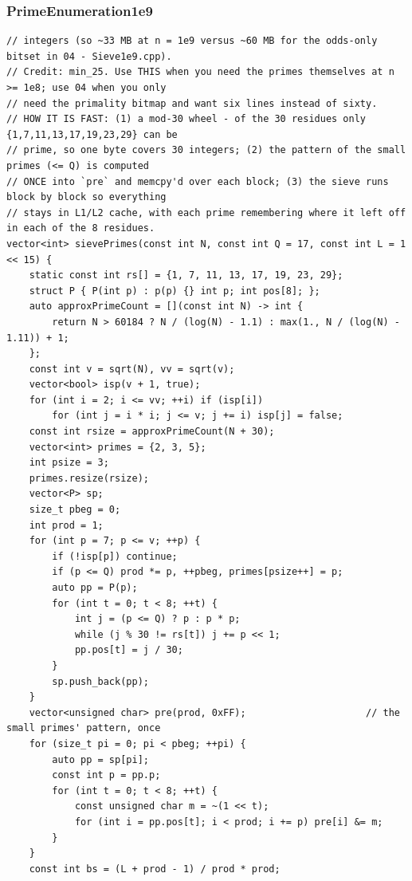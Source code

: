 \documentclass[9pt,a4paper,twocolumn]{extarticle}
\begin{document}
\subsubsection{PrimeEnumeration1e9}
\nopagebreak
\begin{lstlisting}
// integers (so ~33 MB at n = 1e9 versus ~60 MB for the odds-only bitset in 04 - Sieve1e9.cpp).
// Credit: min_25. Use THIS when you need the primes themselves at n >= 1e8; use 04 when you only
// need the primality bitmap and want six lines instead of sixty.
// HOW IT IS FAST: (1) a mod-30 wheel - of the 30 residues only {1,7,11,13,17,19,23,29} can be
// prime, so one byte covers 30 integers; (2) the pattern of the small primes (<= Q) is computed
// ONCE into `pre` and memcpy'd over each block; (3) the sieve runs block by block so everything
// stays in L1/L2 cache, with each prime remembering where it left off in each of the 8 residues.
vector<int> sievePrimes(const int N, const int Q = 17, const int L = 1 << 15) {
    static const int rs[] = {1, 7, 11, 13, 17, 19, 23, 29};
    struct P { P(int p) : p(p) {} int p; int pos[8]; };
    auto approxPrimeCount = [](const int N) -> int {
        return N > 60184 ? N / (log(N) - 1.1) : max(1., N / (log(N) - 1.11)) + 1;
    };
    const int v = sqrt(N), vv = sqrt(v);
    vector<bool> isp(v + 1, true);
    for (int i = 2; i <= vv; ++i) if (isp[i])
        for (int j = i * i; j <= v; j += i) isp[j] = false;
    const int rsize = approxPrimeCount(N + 30);
    vector<int> primes = {2, 3, 5};
    int psize = 3;
    primes.resize(rsize);
    vector<P> sp;
    size_t pbeg = 0;
    int prod = 1;
    for (int p = 7; p <= v; ++p) {
        if (!isp[p]) continue;
        if (p <= Q) prod *= p, ++pbeg, primes[psize++] = p;
        auto pp = P(p);
        for (int t = 0; t < 8; ++t) {
            int j = (p <= Q) ? p : p * p;
            while (j % 30 != rs[t]) j += p << 1;
            pp.pos[t] = j / 30;
        }
        sp.push_back(pp);
    }
    vector<unsigned char> pre(prod, 0xFF);                     // the small primes' pattern, once
    for (size_t pi = 0; pi < pbeg; ++pi) {
        auto pp = sp[pi];
        const int p = pp.p;
        for (int t = 0; t < 8; ++t) {
            const unsigned char m = ~(1 << t);
            for (int i = pp.pos[t]; i < prod; i += p) pre[i] &= m;
        }
    }
    const int bs = (L + prod - 1) / prod * prod;

\end{lstlisting}
\end{document}
